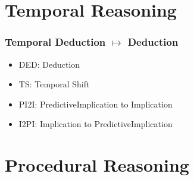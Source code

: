 \documentclass[aspectratio=169]{beamer}
\begin{document}
\section {Temporal Reasoning}

\begin{frame}
  \frametitle{Temporal Deduction $\mapsto$ Deduction}
  {\small
    \begin{prooftree}
    \end{prooftree}}

  \begin{itemize}
  \item DED: Deduction
  \item TS: Temporal Shift
  \item PI2I: PredictiveImplication to Implication
  \item I2PI: Implication to PredictiveImplication
  \end{itemize}
\end{frame}

\section{Procedural Reasoning}
\end{document}
